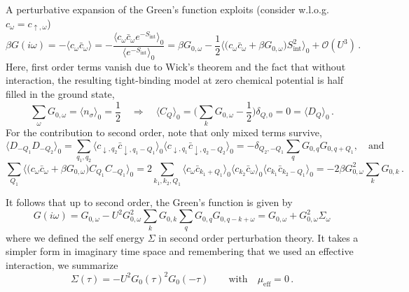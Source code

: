 \documentclass[11pt]{article}
\begin{document}
A perturbative expansion of the Green's function exploits (consider w.l.o.g. $c_{\omega} = c_{\uparrow, \omega}$) 
%
\begin{equation*}
\beta G(i\omega) = - \langle c_{\omega} \bar{c}_{\omega} \rangle
	= - \frac{\langle c_{\omega} \bar{c}_{\omega} e^{-S_{\text{int}}} \rangle_0}
	{\langle e^{-S_{\text{int}}} \rangle_0}
	= \beta G_{0, \omega} - \frac{1}{2} \langle 
	\big( c_{\omega} \bar{c}_{\omega} + \beta G_{0, \omega} \big)
	 S_{\text{int}}^2 \rangle_0 + \mathcal{O}(U^3)
\, .
\end{equation*}
%
Here, first order terms vanish due to Wick's theorem and the fact that without interaction, the resulting tight-binding model at zero chemical potential is half filled in the ground state,
%
\begin{equation*}
\sum_{\omega} G_{0, \omega} = \langle n_{\sigma} \rangle_0 = \frac{1}{2}
\quad
\Rightarrow
\quad
\langle C_Q \rangle_0 =  \big( \sum_{k} G_{0, \omega} - \frac{1}{2} \big) \delta_{Q,0} = 0
	= \langle D_Q \rangle_0
\, .
\end{equation*}
%
For the contribution to second order, note that only mixed terms survive,
%
\begin{equation*}
\langle D_{-Q_1} D_{-Q_2} \rangle_0
	= \sum_{q_1, q_2}
		\langle c_{\downarrow,q_2} \bar{c}_{\downarrow,q_1-Q_1} \rangle_0
		\langle c_{\downarrow,q_1} \bar{c}_{\downarrow,q_2-Q_2} \rangle_0
	= - \delta_{Q_2, -Q_1} \sum_{q} G_{0,q}G_{0,q+Q_1},
\quad
\text{and}
\end{equation*}
%
\begin{equation*}
\sum_{Q_1} \langle \big( c_{\omega} \bar{c}_{\omega}  +  \beta G_{0, \omega} \big) C_{Q_1} C_{-Q_1} \rangle_0 
	= 2 \sum_{k_1, k_2, Q_1}
		\langle c_{\omega} \bar{c}_{k_1+Q_1} \rangle_0
		\langle c_{k_2} \bar{c}_{\omega} \rangle_0
		\langle c_{k_1} \bar{c}_{k_2-Q_1} \rangle_0
	= -2 \beta G_{0,\omega}^2 \sum_k G_{0,k}
\, .
\end{equation*}

It follows that up to second order, the Green's function is given by
%
\begin{equation*}
G(i\omega) = G_{0, \omega} - U^2 G_{0,\omega}^2 
	\sum_k G_{0,k} \sum_{q} G_{0,q}G_{0,q-k+\omega}
	= G_{0, \omega} + G_{0,\omega}^2 \Sigma_{\omega}
\end{equation*}
%
where we defined the self energy $\Sigma$ in second order perturbation theory. It takes a simpler form in imaginary time space and remembering that we used an effective interaction, we summarize 
%
\begin{equation}
\Sigma(\tau) = - U^2 G_0(\tau)^2 G_0(-\tau)
\quad \quad
\text{with}
\quad 
\mu_{\text{eff}} = 0
\, .
\end{equation}
\end{document}
